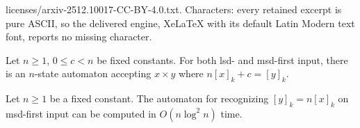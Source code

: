 \documentclass[10pt,a4paper]{amsart}
\begin{document}
licenses/arxiv-2512.10017-CC-BY-4.0.txt. Characters: every retained excerpt is pure ASCII, so the delivered engine, XeLaTeX with its default Latin Modern text font, reports no missing character.
\begin{theorem} \label{theorem:n[x]+c=[y]-sc}
Let $n \geq 1$, $0 \leq c < n$ be fixed constants.
For both lsd- and msd-first input, there is an $n$-state automaton accepting $x \times y$ where $n[x]_k + c = [y]_k$.
\end{theorem}

\begin{theorem} \label{theorem:y=n[x]-time}
    Let $n \geq 1$ be a fixed constant.
    The automaton for recognizing $[y]_k = n[x]_k$ on msd-first input can be computed in $O(n \log^2 n)$ time. 
\end{theorem}
\end{document}
